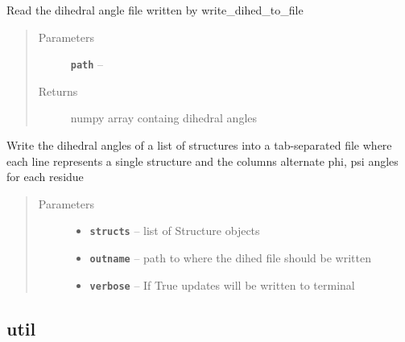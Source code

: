 \documentclass[letterpaper,10pt,english]{sphinxmanual}
\begin{document}
\begin{fulllineitems}
\label{modules:readutil.read_dihed_file}
Read the dihedral angle file written by write\_dihed\_to\_file
\begin{quote}\begin{description}
\item[{Parameters}] \leavevmode
\textbf{\texttt{path}} -- 

\item[{Returns}] \leavevmode
numpy array containg dihedral angles

\end{description}\end{quote}

\end{fulllineitems}


\begin{fulllineitems}
\label{modules:readutil.write_dihed_to_file}
Write the dihedral angles of a list of structures into a tab-separated
file where each line represents a single structure and the columns
alternate phi, psi angles for each residue
\begin{quote}\begin{description}
\item[{Parameters}] \leavevmode\begin{itemize}
\item {} 
\textbf{\texttt{structs}} -- list of Structure objects

\item {} 
\textbf{\texttt{outname}} -- path to where the dihed file should be written

\item {} 
\textbf{\texttt{verbose}} -- If True updates will be written to terminal

\end{itemize}

\end{description}\end{quote}

\end{fulllineitems}



\subsection{util}
\label{modules:util}\label{modules:module-util}
\end{document}
